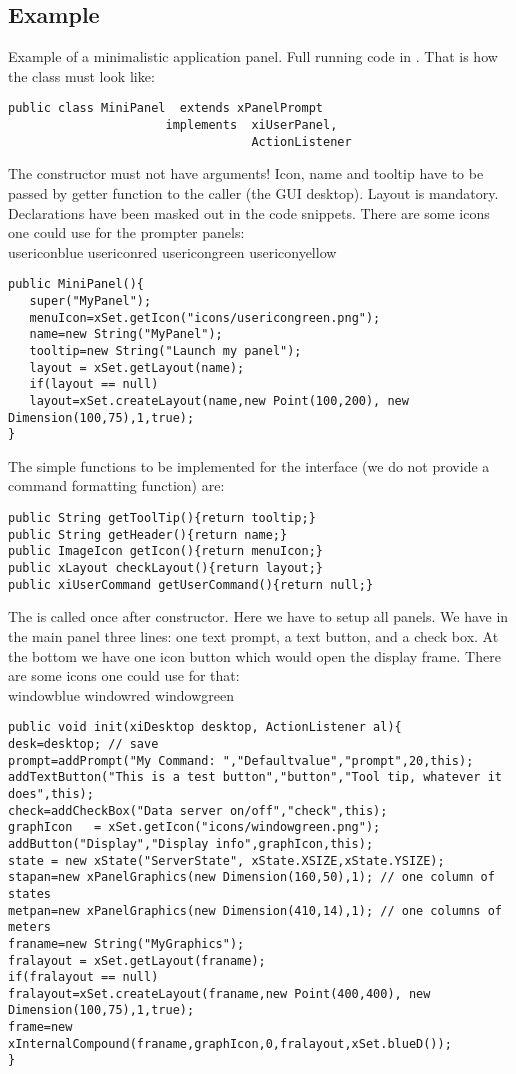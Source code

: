 \subsection{Example}
Example of a minimalistic application panel.
Full running code in .
That is how the class must look like:
{\small \begin{verbatim}
public class MiniPanel  extends xPanelPrompt
                      implements  xiUserPanel,
                                  ActionListener 
\end{verbatim}
}
The constructor must not have arguments! Icon, name and tooltip have to be
passed by getter function to the caller (the GUI desktop). Layout is mandatory.
Declarations have been masked out in the code snippets.
There are some icons one could use for the prompter panels:\\
 usericonblue 
 usericonred 
 usericongreen 
 usericonyellow 
{\small \begin{verbatim}
public MiniPanel(){
   super("MyPanel");
   menuIcon=xSet.getIcon("icons/usericongreen.png");
   name=new String("MyPanel");
   tooltip=new String("Launch my panel");
   layout = xSet.getLayout(name);
   if(layout == null)
   layout=xSet.createLayout(name,new Point(100,200), new Dimension(100,75),1,true);
}
\end{verbatim}
}
The simple functions to be implemented for the interface 
(we do not provide a command formatting function) are:
{\small \begin{verbatim}
public String getToolTip(){return tooltip;}
public String getHeader(){return name;}
public ImageIcon getIcon(){return menuIcon;}
public xLayout checkLayout(){return layout;}
public xiUserCommand getUserCommand(){return null;}
\end{verbatim}
}
The  is called once after constructor. Here we have to setup all panels.
We have in the main panel three lines: one text prompt, a text button, and a check box.
At the bottom we have one icon button which would open the display frame.
There are some icons one could use for that:\\
 windowblue 
 windowred 
 windowgreen 
{\small \begin{verbatim}
public void init(xiDesktop desktop, ActionListener al){
desk=desktop; // save
prompt=addPrompt("My Command: ","Defaultvalue","prompt",20,this);
addTextButton("This is a test button","button","Tool tip, whatever it does",this);
check=addCheckBox("Data server on/off","check",this);
graphIcon   = xSet.getIcon("icons/windowgreen.png");
addButton("Display","Display info",graphIcon,this);
state = new xState("ServerState", xState.XSIZE,xState.YSIZE);
stapan=new xPanelGraphics(new Dimension(160,50),1); // one column of states
metpan=new xPanelGraphics(new Dimension(410,14),1); // one columns of meters
franame=new String("MyGraphics");
fralayout = xSet.getLayout(franame);
if(fralayout == null)
fralayout=xSet.createLayout(franame,new Point(400,400), new Dimension(100,75),1,true);
frame=new xInternalCompound(franame,graphIcon,0,fralayout,xSet.blueD());
}
\end{verbatim}
}
